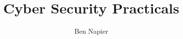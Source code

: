 \documentclass[a4paper, answers]{exam}
\title{Cyber Security Practicals}
\author{Ben Napier}
\begin{document}
    \maketitle
    \tableofcontents
    \begin{questions}
        
    \end{questions}
\end{document}
